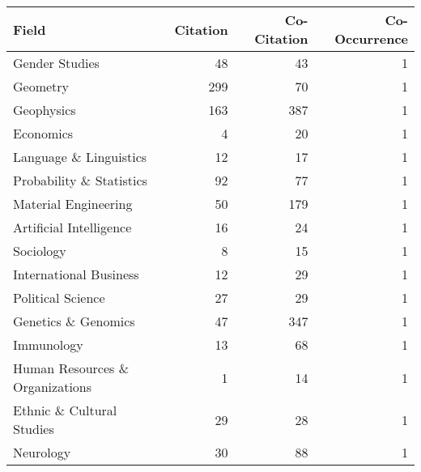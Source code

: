 \begin{tabular}{lrrr}
\toprule
                          Field &  Citation &  Co-Citation &  Co-Occurrence \\
\midrule
                 Gender Studies &        48 &           43 &              1 \\
                       Geometry &       299 &           70 &              1 \\
                     Geophysics &       163 &          387 &              1 \\
                      Economics &         4 &           20 &              1 \\
         Language \& Linguistics &        12 &           17 &              1 \\
       Probability \& Statistics &        92 &           77 &              1 \\
           Material Engineering &        50 &          179 &              1 \\
        Artificial Intelligence &        16 &           24 &              1 \\
                      Sociology &         8 &           15 &              1 \\
         International Business &        12 &           29 &              1 \\
              Political Science &        27 &           29 &              1 \\
            Genetics \& Genomics &        47 &          347 &              1 \\
                     Immunology &        13 &           68 &              1 \\
Human Resources \& Organizations &         1 &           14 &              1 \\
      Ethnic \& Cultural Studies &        29 &           28 &              1 \\
                      Neurology &        30 &           88 &              1 \\
\bottomrule
\end{tabular}
